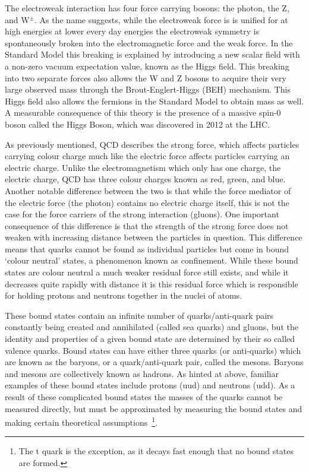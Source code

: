 The electroweak interaction has four force carrying bosons: the photon, the Z, and W$^{\pm}$.  
As the name suggests, while the electroweak force is is unified for at high energies at lower every day energies the electroweak symmetry is spontaneously broken into the electromagnetic force and the weak force.  
In the Standard Model this breaking is explained by introducing a new scalar field with a non-zero vacuum expectation value, known as the Higgs field.  
This breaking into two separate forces also allows the W and Z bosons to acquire their very large observed mass through the Brout-Englert-Higgs (BEH) mechanism.  
This Higgs field also allows the fermions in the Standard Model to obtain mass as well.  
A measurable consequence of this theory is the presence of a massive spin-0 boson called the Higgs Boson, which was discovered in 2012 at the \gls{LHC}.  

As previously mentioned, \gls{QCD} describes the strong force, which affects particles carrying colour charge much like the electric force affects particles carrying an electric charge.  
Unlike the electromagnetism which only has one charge, the electric charge, \gls{QCD} has three colour charges known as red, green, and blue.  
Another notable difference between the two is that while the force mediator of the electric force (the photon) contains no electric charge itself, this is not the case for the force carriers of the strong interaction (gluons).  
One important consequence of this difference is that the strength of the strong force does not weaken with increasing distance between the particles in question.  
This difference means that quarks cannot be found as individual particles but come in bound `colour neutral' states, a phenomenon known as confinement.  
While these bound states are colour neutral a much weaker residual force still exists, and while it decreases quite rapidly with distance it is this residual force which is responsible for holding protons and neutrons together in the nuclei of atoms.  

These bound states contain an infinite number of quarks/anti-quark pairs constantly being created and annihilated (called sea quarks) and gluons, but the identity and properties of a given bound state are determined by their so called valence quarks.  
Bound states can have either three quarks (or anti-quarks) which are known as the baryons, or a quark/anti-quark pair, called the mesons.  
Baryons and mesons are collectively known as hadrons.  
As hinted at above, familiar examples of these bound states include protons (uud) and neutrons (udd).  
As a result of these complicated bound states the masses of the quarks cannot be measured directly, but must be approximated by measuring the bound states and making certain theoretical assumptions~\footnote{The t quark is the exception, as it decays fast enough that no bound states are formed.}.
 

